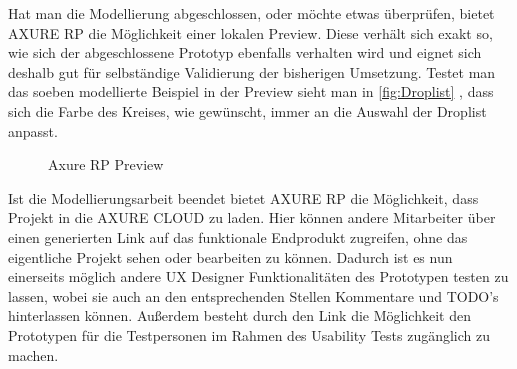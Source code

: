 Hat man die Modellierung abgeschlossen, oder möchte etwas überprüfen, bietet AXURE RP die Möglichkeit einer lokalen Preview.
Diese verhält sich exakt so, wie sich der abgeschlossene Prototyp ebenfalls verhalten wird und eignet sich deshalb gut für selbständige Validierung der bisherigen Umsetzung.
Testet man das soeben modellierte Beispiel in der Preview sieht man in \cref{fig:Droplist} , dass sich die Farbe des Kreises, wie gewünscht, immer an die Auswahl der Droplist anpasst.
\begin{figure}%
\centering
{}%
\qquad
{}%
\qquad
{}%
\qquad
{}%

\caption{Axure RP Preview}%
\label{fig:Preview}
\end{figure}

Ist die Modellierungsarbeit beendet bietet AXURE RP die Möglichkeit, dass Projekt in die AXURE CLOUD zu laden.
Hier können andere Mitarbeiter über einen generierten Link auf das funktionale Endprodukt zugreifen, ohne das eigentliche Projekt sehen oder bearbeiten zu können.
Dadurch ist es nun einerseits möglich andere UX Designer Funktionalitäten des Prototypen testen zu lassen, wobei sie auch an den entsprechenden Stellen Kommentare und TODO's hinterlassen können.
Außerdem besteht durch den Link die Möglichkeit den Prototypen für die Testpersonen im Rahmen des Usability Tests zugänglich zu machen.

